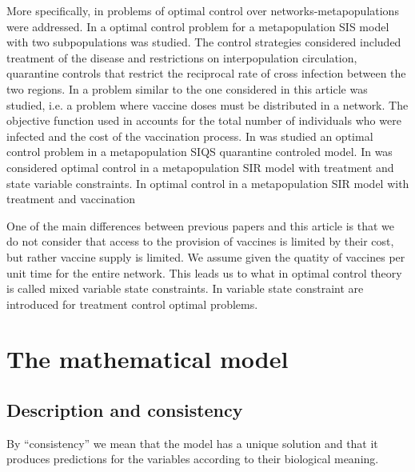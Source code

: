 \documentclass[a4paper,10pt]{article}
\theoremstyle{remark}
\begin{document}
More specifically, in \cite{rowthorn2009optimal,asano2008optimal, mbah2011resource,Chen-2014,Chen-2014b}  problems of optimal control over networks-metapopulations were addressed.
In \cite{rowthorn2009optimal} a optimal control problem for a metapopulation SIS model with two subpopulations was studied.  The control strategies considered included treatment of the disease and restrictions on interpopulation circulation, quarantine controls that
restrict the reciprocal rate of cross infection between
the two regions. In \cite{asano2008optimal} a problem similar to the one considered in this article was studied, i.e. a problem  where vaccine doses must be distributed in a network. The objective function used in \cite{asano2008optimal} accounts for the total number of individuals who were infected and the cost of the vaccination process.  In \cite{Li-2019} was studied an optimal control problem in a metapopulation  SIQS quarantine controled  model. In \cite{mbah2011resource} was considered optimal control in a metapopulation  SIR model with   treatment and state variable constraints. 
In \cite{Chen-2014,Chen-2014b} optimal control in a metapopulation  SIR model with   treatment and vaccination
 
 One of the main differences between previous papers  and this article is that we do not consider that access to the provision of vaccines is  limited by their cost, but rather vaccine supply is limited. We assume given the quatity of vaccines per unit time   for the entire network. This leads us to what in optimal control theory is called mixed variable state constraints. In \cite{mbah2011resource, rowthorn2009optimal} variable state constraint are introduced for  treatment control optimal problems.  

 

 
\section{The mathematical model}


\subsection{Description and consistency}
By ``consistency'' we mean that the model has a unique solution and  that it produces predictions  for the variables according to their biological meaning.
\end{document}
